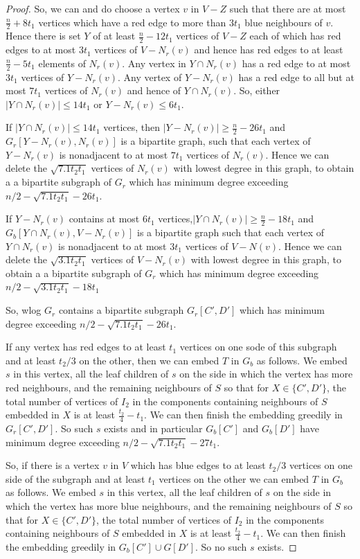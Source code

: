 \documentclass[11pt]{article}
\begin{document}
\begin{proof}
So, we can and do choose  a vertex $v$ in $V-Z$ such that there are at most  
$\frac{n}{2}+8t_1$ vertices  which have a red edge to  more than $3t_1$ blue    neighbours of $v$.  
Hence there is set  $Y$ of at least $\frac{n}{2}-12t_1$ vertices of $V-Z$ each of which has red edges to at most $3t_1$
vertices of $V-N_r(v)$ and hence has red edges to at least 
$\frac{n}{2}-5t_1$ elements of $N_r(v)$. Any  vertex in $Y \cap N_r(v)$ has a red edge to   at most 
$3t_1$ vertices  of $Y-N_r(v)$. Any vertex of $Y-N_r(v)$ has a red edge 
to all but  at most $7t_1$ vertices of $N_r(v)$ and hence of $Y \cap N_r(v)$. So, either  $|Y \cap N_r(v)|\le 14t_1$
or $Y - N_r(v) \le 6t_1$.

If $|Y \cap N_r(v)| \le 14t_1$ vertices, then $| Y-N_r(v)| \ge \frac{n}{2}-26t_1$ and $G_r[Y-N_r(v),N_r(v)]$ 
is a bipartite graph, such that 
each vertex of $Y-N_r(v)$ is nonadjacent to at most $7t_1$ vertices of $N_r(v)$. Hence we can delete
the $\sqrt{7.1t_2t_1}$ vertices of $N_r(v)$ with lowest degree in this graph, to obtain a 
a bipartite subgraph  of $G_r$  which has minimum degree exceeding $n/2-\sqrt{7.1t_2t_1}-26t_1$.

If $Y - N_r(v)$ contains at most $6t_1$ vertices,$|Y \cap N_r(v)| \ge \frac{n}{2}-18t_1$ and   $ G_b [Y \cap N_r(v),V-N_r(v)]$ 
is a bipartite graph  such that 
each vertex of $Y \cap N_r(v)$ is nonadjacent to at most $3t_1$ vertices of $V-N(v)$. Hence we can delete
the $\sqrt{3.1t_2t_1}$ vertices of $V-N_r(v)$ with lowest degree in this graph, to obtain a 
a bipartite subgraph   of $G_r$ which has minimum degree exceeding $n/2-\sqrt{3.1t_2t_1}-18t_1$

So, wlog $G_r$ contains a bipartite subgraph $G_r[ C',D']$   which has minimum degree exceeding $n/2-\sqrt{7.1t_2t_1}-26t_1$.

If any vertex  has red edges to  at least $t_1$ vertices on one sode of this subgraph and at least $t_2/3$ on the other, then we can embed $T$ in $G_b$  as follows. We embed  $s$ in this vertex,  all the leaf 
children of $s$ on the  side in which the vertex  has  more red neighbours, and the remaining neighbours of $S$ so that  for $X \in \{C',D'\}$, the total number of vertices of $I_2$ 
in the components  containing neighbours of $S$  embedded  in $X$ is at least $\frac{t_2}{4}-t_1$.
We can then finish the embedding greedily in $G_r[C',D']$. So such $s$ exists and in particular 
 $G_b[C']$ and $G_b[D']$ have minimum degree exceeding $n/2-\sqrt{7.1t_2t_1}-27t_1$. %

So,  if there is  a vertex $v$ in $V$ which has blue edges to at least $t_2/3$ vertices on one side of the 
subgraph and  at least $t_1$ vertices on the other   we can embed $T$ in $G_b$ as follows. 
We embed $s$ in this vertex, all the leaf 
children of $s$ on the  side in which the vertex  has  more blue  neighbours, and the remaining neighbours of $S$ so that  for $X \in \{C',D'\}$, the total number of vertices of $I_2$ 
in the components  containing neighbours of $S$  embedded  in $X$ is at least $\frac{t_2}{4}-t_1$.
We can then finish the embedding greedily in $G_b[C'] 
\cup G[D']$. So no such $s$ exists.


\end{proof}
\end{document}
